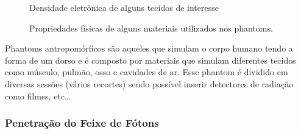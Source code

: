 \documentclass[11pt,a4paper]{article}
\begin{document}
		\begin{figure}[h]
			\centering
			\caption{Densidade eletrônica de alguns tecidos de interesse}
			\label{fig:densidadeEletronica}
		\end{figure}

		\begin{figure}[h]
			\centering
			\caption{Propriedades físicas de alguns materiais utilizados nos phantoms.}
			\label{fig:materiaisPhanton}
		\end{figure}


	Phantoms antropomórficos são aqueles que simulam o corpo humano tendo a forma de um dorso e é composto por materiais que simulam diferentes tecidos como músculo, pulmão, osso e cavidades de ar. Esse phantom é dividido em diversas sessões (vários recortes) sendo possível inserir detectores de radiação como filmes, etc\dots

\subsubsection*{Penetração do Feixe de Fótons}
\end{document}
